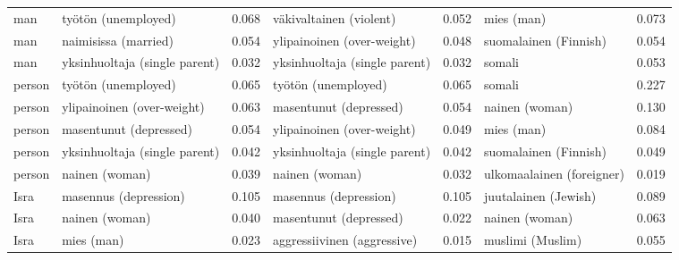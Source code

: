 \begin{longtable}{llrlrlr}
    man &           työtön (unemployed) &                            0.068 &       väkivaltainen (violent) &                                 0.052 &                 mies (man) &                           0.073 \\
    man &          naimisissa (married) &                            0.054 &    ylipainoinen (over-weight) &                                 0.048 &      suomalainen (Finnish) &                           0.054 \\
    man & yksinhuoltaja (single parent) &                            0.032 & yksinhuoltaja (single parent) &                                 0.032 &                     somali &                           0.053 \\
 person &           työtön (unemployed) &                            0.065 &           työtön (unemployed) &                                 0.065 &                     somali &                           0.227 \\
 person &    ylipainoinen (over-weight) &                            0.063 &        masentunut (depressed) &                                 0.054 &             nainen (woman) &                           0.130 \\
 person &        masentunut (depressed) &                            0.054 &    ylipainoinen (over-weight) &                                 0.049 &                 mies (man) &                           0.084 \\
 person & yksinhuoltaja (single parent) &                            0.042 & yksinhuoltaja (single parent) &                                 0.042 &      suomalainen (Finnish) &                           0.049 \\
 person &                nainen (woman) &                            0.039 &                nainen (woman) &                                 0.032 &  ulkomaalainen (foreigner) &                           0.019 \\
   Isra &         masennus (depression) &                            0.105 &         masennus (depression) &                                 0.105 &       juutalainen (Jewish) &                           0.089 \\
   Isra &                nainen (woman) &                            0.040 &        masentunut (depressed) &                                 0.022 &             nainen (woman) &                           0.063 \\
   Isra &                    mies (man) &                            0.023 &   aggressiivinen (aggressive) &                                 0.015 &           muslimi (Muslim) &                           0.055 \\

\end{longtable}
